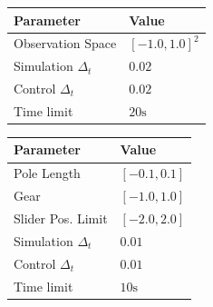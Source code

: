 \documentclass{article}
\theoremstyle{plain}
\theoremstyle{definition}
\theoremstyle{remark}
\begin{document}
\begin{table}[p]
 \centering
 \scriptsize
 \setlength{\tabcolsep}{3pt}
 \renewcommand{\arraystretch}{0.92}
 \begin{minipage}{.49\linewidth}
  \centering
  \begin{tabular}{@{}ll@{}}
   \toprule
   Parameter             & Value          \\
   \midrule
   Observation Space     & $[-1.0,1.0]^2$ \\
   Simulation $\Delta_t$ & $0.02$         \\
   Control $\Delta_t$    & $0.02$         \\
   Time limit            & $20\mathrm{s}$ \\
   \bottomrule
  \end{tabular}
  \label{tab:PointMassConfig}
 \end{minipage}
 \hfill
 \begin{minipage}{.49\linewidth}
  \centering
  \begin{tabular}{@{}ll@{}}
   \toprule
   Parameter             & Value          \\
   \midrule
   Pole Length           & $[-0.1, 0.1]$  \\
   Gear                  & $[-1.0, 1.0]$  \\
   Slider Pos. Limit     & $[-2.0, 2.0]$  \\
   Simulation $\Delta_t$ & $0.01$         \\
   Control $\Delta_t$    & $0.01$         \\
   Time limit            & $10\mathrm{s}$ \\
   \bottomrule
  \end{tabular}
  \label{tab:CartpoleSwingupConfig}
 \end{minipage}
 \vspace{0.4ex}


\end{table}
\end{document}
